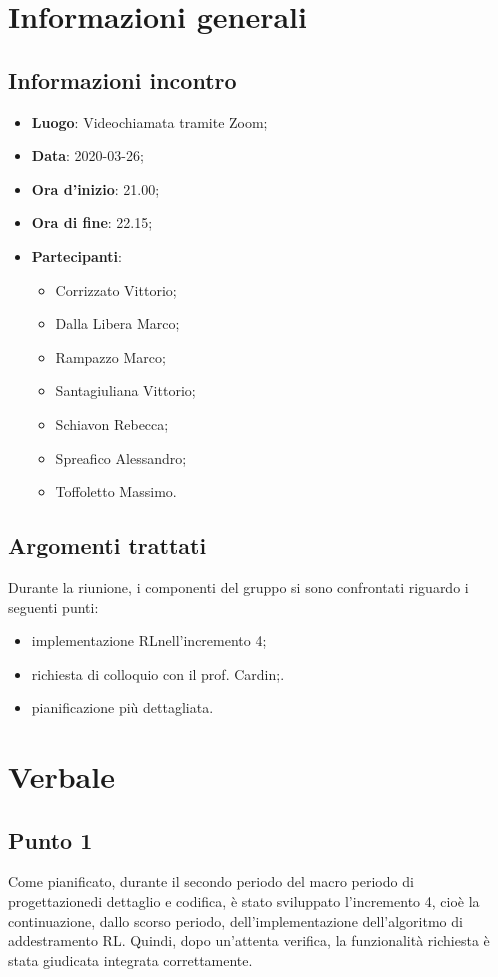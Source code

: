 \section{Informazioni generali}
\subsection{Informazioni incontro}
\begin{itemize}
	\item \textbf{Luogo}: Videochiamata tramite Zoom;
	\item \textbf{Data}: 2020-03-26;
	\item \textbf{Ora d'inizio}: 21.00;
	\item \textbf{Ora di fine}: 22.15;
	\item \textbf{Partecipanti}: \begin{itemize}
		\item Corrizzato Vittorio;
		\item Dalla Libera Marco;
		\item Rampazzo Marco;
		\item Santagiuliana Vittorio;
		\item Schiavon Rebecca;
		\item Spreafico Alessandro;
		\item Toffoletto Massimo.
	\end{itemize}
\end{itemize}
\subsection{Argomenti trattati}
Durante la riunione, i componenti del gruppo si sono confrontati riguardo i seguenti punti:
\begin{itemize}
	\item implementazione RL\glosp nell'incremento 4;
	\item richiesta di colloquio con il prof. Cardin;.	
	\item pianificazione più dettagliata.
\end{itemize}

\section{Verbale}
\subsection{Punto 1}
Come pianificato, durante il secondo periodo del macro periodo di progettazione\glosp di dettaglio e codifica, è stato sviluppato l'incremento 4, cioè la continuazione, dallo scorso periodo, dell'implementazione dell'algoritmo di addestramento RL\glo. Quindi, dopo un'attenta verifica, la funzionalità richiesta è stata giudicata integrata correttamente.

